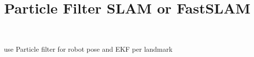 \documentclass[a4paper]{article}
\title{Particle Filter SLAM or FastSLAM}
\date{}
\begin{document}
    \maketitle
    use Particle filter for robot pose and EKF per landmark
\end{document}
